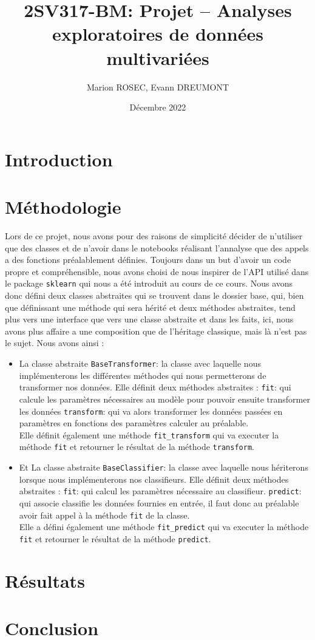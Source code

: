 \documentclass{NewTeX}
\title{2SV317-BM: Projet -- Analyses exploratoires de données multivariées}
\author{Marion ROSEC, Evann DREUMONT}
\date{Décembre 2022}
\begin{document}
    \maketitle


    \section{Introduction}\label{sec:introduction}


    \section{Méthodologie}\label{sec:methodologie}

    Lors de ce projet, nous avons pour des raisons de simplicité décider de n'utiliser que des classes et de n'avoir dans le notebooks réalisant l'annalyse que des appels a des fonctions préalablement définies.
    Toujours dans un but d'avoir un code propre et compréhensible, nous avons choisi de nous inspirer de l'API utilisé dans le package \verb|sklearn| qui nous a été introduit au cours de ce cours.
    Nous avons donc défini deux classes abstraites qui se trouvent dans le dossier base, qui, bien que définissant une méthode qui sera hérité et deux méthodes abstraites, tend plus vers une interface que vers une classe abstraite et dans les faits, ici, nous avons plus affaire a une composition que de l'héritage classique, mais là n'est pas le sujet.
    Nous avons ainsi :
    \begin{itemize}
        \item La classe abstraite \verb|BaseTransformer|: la classe avec laquelle nous implémenterons les différentes méthodes qui nous permetterons de transformer nos données.
        Elle définit deux méthodes abstraites :
        \subitem \verb|fit|: qui calcule les paramètres nécessaires au modèle pour pouvoir ensuite transformer les données
        \subitem \verb|transform|: qui va alors transformer les données passées en paramètres en fonctions des paramètres calculer au préalable. \\
        Elle définit également une méthode \verb|fit_transform| qui va executer la méthode \verb|fit| et retourner le résultat de la méthode \verb|transform|.
        \item Et La classe abstraite \verb|BaseClassifier|: la classe avec laquelle nous hériterons lorsque nous implémenterons nos classifieurs.
        Elle définit deux méthodes abstraites :
        \subitem \verb|fit|: qui calcul les paramètres nécessaire au classifieur.
        \subitem \verb|predict|: qui associe classifie les données fournies en entrée, il faut donc au préalable avoir fait appel à la méthode \verb|fit| de la classe. \\
        Elle a défini également une méthode \verb|fit_predict| qui va executer la méthode \verb|fit| et retourner le résultat de la méthode \verb|predict|.
    \end{itemize}



    \section{Résultats}\label{sec:resultats}


    \section{Conclusion}\label{sec:conclusion}
\end{document}
